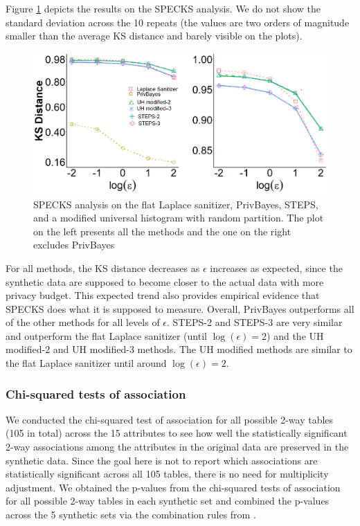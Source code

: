 \documentclass[12pt, A4]{article}
\theoremstyle{plain}
\theoremstyle{exampstyle}\newtheorem{defn}{Definition}
\theoremstyle{exampstyle}\newtheorem{lem}{Lemma}
\theoremstyle{exampstyle}\newtheorem{cor}{Corollary}
\theoremstyle{exampstyle}\newtheorem{pro}{Proposition}
\theoremstyle{exampstyle}\newtheorem{cla}{Claim}
\theoremstyle{exampstyle}\newtheorem{rem}{Remark}
\begin{document}
Figure \ref{fig:SPECKS} depicts the results on the SPECKS analysis. We do not show the standard deviation across the 10 repeats (the values are two orders of magnitude smaller than the average KS distance and barely visible on the plots).
\begin{figure}[!htb]
\centerline{\includegraphics[scale=0.35]{SPECKS2.png}}
\vspace{-6pt}\caption{SPECKS analysis on the flat Laplace sanitizer, PrivBayes, STEPS, and a modified universal histogram with random partition. The plot on the left presents all the methods and the one on the right excludes PrivBayes} \label{fig:SPECKS}
\end{figure}
For all methods, the KS distance decreases as $\epsilon$ increases as expected, since the synthetic data are supposed to become closer to the actual data with more privacy budget. This expected trend also provides empirical evidence that SPECKS does what it is supposed to measure. Overall, PrivBayes outperforms all of the other methods for all levels of $\epsilon$. STEPS-2 and STEPS-3 are very similar and outperform the flat Laplace sanitizer (until $\log(\epsilon)=2$) and the UH modified-2 and UH modified-3 methods. The UH modified methods are similar to the flat Laplace sanitizer until around $\log(\epsilon)=2$. 

\subsubsection{Chi-squared tests of association}\label{sec:chi}
We conducted the chi-squared test of association for all possible 2-way tables (105 in total) across the 15 attributes to see how well the  statistically significant 2-way associations among the attributes in the original data are preserved in the synthetic data. Since the goal here is not to report which associations are statistically significant across all 105 tables, there is no need for multiplicity adjustment. We obtained the p-values from the chi-squared tests of association for all possible 2-way tables in each synthetic set and combined the p-values across the 5 synthetic sets via the combination rules from \citet{li1991significance}. 
\end{document}
